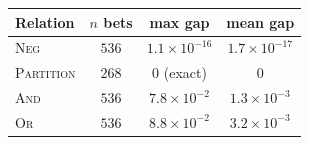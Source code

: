 \begin{tabular}{@{}lccc@{}}
\toprule
Relation     & $n$ bets & max gap                  & mean gap                 \\
\midrule
\textsc{Neg} & $536$    & $1.1\!\times\!10^{-16}$  & $1.7\!\times\!10^{-17}$  \\
\textsc{Partition} & $268$ & $0$ (exact)           & $0$                      \\
\textsc{And} & $536$    & $7.8\!\times\!10^{-2}$   & $1.3\!\times\!10^{-3}$   \\
\textsc{Or}  & $536$    & $8.8\!\times\!10^{-2}$   & $3.2\!\times\!10^{-3}$   \\
\bottomrule
\end{tabular}
